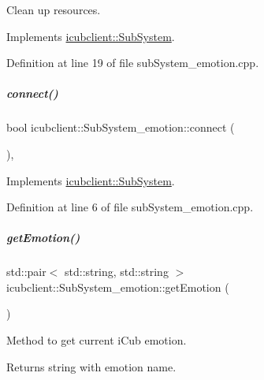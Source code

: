 Clean up resources. 



Implements \hyperlink{group__icubclient__subsystems_af327c56ad0d33aada77f825d96fb47f2}{icubclient\+::\+Sub\+System}.



Definition at line 19 of file sub\+System\+\_\+emotion.\+cpp.

\mbox{\label{group__icubclient__subsystems_af55715ece8170cb63fc2546f2bdcfcf1}} 
\subparagraph{\texorpdfstring{connect()}{connect()}}
{\footnotesize\ttfamily bool icubclient\+::\+Sub\+System\+\_\+emotion\+::connect (\begin{DoxyParamCaption}{ }\end{DoxyParamCaption})\hspace{0.3cm}{\ttfamily [protected]}, {\ttfamily [virtual]}}



Implements \hyperlink{group__icubclient__subsystems_a5fc84b6e51ec56f91323280b7da52dc8}{icubclient\+::\+Sub\+System}.



Definition at line 6 of file sub\+System\+\_\+emotion.\+cpp.

\mbox{\label{group__icubclient__subsystems_ad90b6e7e287e41f8fcdb70937cf51c37}} 
\subparagraph{\texorpdfstring{get\+Emotion()}{getEmotion()}}
{\footnotesize\ttfamily std\+::pair$<$ std\+::string, std\+::string $>$ icubclient\+::\+Sub\+System\+\_\+emotion\+::get\+Emotion (\begin{DoxyParamCaption}{ }\end{DoxyParamCaption})}



Method to get current i\+Cub emotion. 

\begin{DoxyReturn}{Returns}
string with emotion name. 
\end{DoxyReturn}



